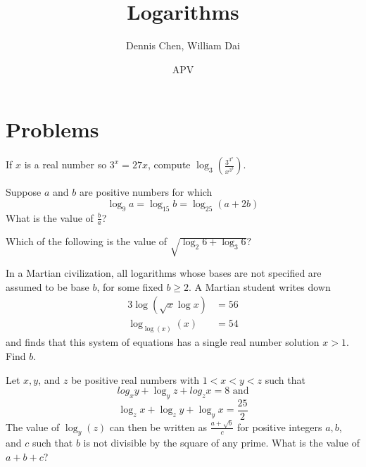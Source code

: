 \documentclass[mast]{lucky}
\title{Logarithms}
\author{Dennis Chen, William Dai}
\date{APV}
\begin{document}
\maketitle



\pagebreak

\section{Problems}



\begin{prob}[PUMaC 2019]{3}
If $x$ is a real number so $3^x = 27x$, compute $\log_{3}(\frac{3^{3^x}}{x^{3^{3}}})$.
\end{prob}

\begin{prob}[MA$\theta$ 1992]{4}
Suppose $a$ and $b$ are positive numbers for which
 $$\log_{9} a  =\log_{15} b =\log_{25}(a+2b)$$
What is the value of $\frac{b}{a}$?
\end{prob}

\begin{req}[AMC 12B 2020/13]{4}
Which of the following is the value of $\sqrt{\log_2{6}+\log_3{6}}?$

\end{req}

\begin{prob}[AIME II 2019/6]{4}
In a Martian civilization, all logarithms whose bases are not specified are assumed to be base $b$, for some fixed $b \geq 2$. A Martian student writes down\begin{align*}3 \log(\sqrt{x}\log x) &= 56\\\log_{\log (x)}(x) &= 54\end{align*}and finds that this system of equations has a single real number solution $x > 1$. Find $b$.
\end{prob}

\begin{prob}{4}
Let $x, y$, and $z$ be positive real numbers with $1 < x < y < z$ such that
$$log_{x} y + \log_{y}z + log_{z}x = 8 \text{ and}$$
$$\log_{z}x + \log_{z}y + \log_{y}x =\frac{25}{2}$$
The value of $\log_{y}(z)$ can then be written as $\frac{a+\sqrt{b}}{c}$ for positive integers $a, b$, and $c$ such that $b$ is not divisible by the square of any prime. What is the value of
$a + b + c$?
\end{prob}
\end{document}
